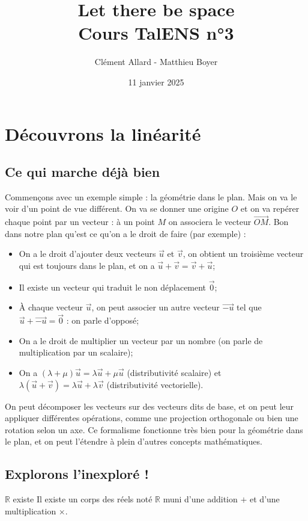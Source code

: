 \documentclass{classe}
\title{Let there be space\\ \small Cours TalENS n°3}
\author{Clément Allard - Matthieu Boyer}
\date{11 janvier 2025}
\begin{document}
\section{Découvrons la linéarité}

\subsection{Ce qui marche déjà bien}

Commençons avec un exemple simple : la géométrie dans le plan. Mais on va le voir d'un point de vue différent. On va se donner une origine $O$ et on va repérer chaque point par un vecteur : à un point $M$ on associera le vecteur $\overrightarrow{OM}$. Bon dans notre plan qu'est ce qu'on a le droit de faire (par exemple) :

\begin{itemize}
	\item On a le droit d'ajouter deux vecteurs $\vec{u}$ et $\vec{v}$, on obtient un troisième vecteur qui est toujours dans le plan, et on a $\vec{u} + \vec{v} = \vec{v} + \vec{u}$;
	\item Il existe un vecteur qui traduit le non déplacement $\vec{0}$;
	\item À chaque vecteur $\vec{u}$, on peut associer un autre vecteur $\overrightarrow{-u}$ tel que $\vec{u} + \overrightarrow{-u} = \vec{0}$ : on parle d'opposé;
	\item On a le droit de multiplier un vecteur par un nombre (on parle de multiplication par un scalaire);
	\item On a $(\lambda + \mu)\vec{u} = \lambda\vec{u} + \mu\vec{u}$ (distributivité scalaire) et $\lambda(\vec{u}+\vec{v}) = \lambda\vec{u}+\lambda\vec{v}$ (distributivité vectorielle).
\end{itemize}

On peut décomposer les vecteurs sur des vecteurs dits de base, et on peut leur appliquer différentes opérations, comme une projection orthogonale ou bien une rotation selon un axe. Ce formalisme fonctionne très bien pour la géométrie dans le plan, et on peut l'étendre à plein d'autres concepts mathématiques.

\subsection{Explorons l'inexploré !}

\begin{théorème}{$\mathbb{R}$ existe}{}
	Il existe un corps des réels noté $\mathbb{R}$ muni d'une addition $+$ et d'une multiplication $\times$.
\end{théorème}
\end{document}
